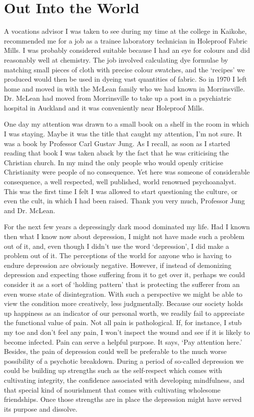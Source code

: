 \chapter{Out Into the World}

A vocations advisor I was taken to see during my time at the college in
Kaikohe, recommended me for a job as a trainee laboratory technician in
Holeproof Fabric Mills. I was probably considered suitable because I had
an eye for colours and did reasonably well at chemistry. The job
involved calculating dye formulae by matching small pieces of cloth with
precise colour swatches, and the `recipes' we produced would then be
used in dyeing vast quantities of fabric. So in 1970 I left home and
moved in with the McLean family who we had known in Morrinsville. Dr.
McLean had moved from Morrinsville to take up a post in a psychiatric
hospital in Auckland and it was conveniently near Holeproof Mills.

One day my attention was drawn to a small book on a shelf in the room in
which I was staying. Maybe it was the title that caught my attention,
I'm not sure. It was a book by Professor Carl Gustav Jung. As I recall,
as soon as I started reading that book I was taken aback by the fact
that he was criticising the Christian church. In my mind the only people
who would openly criticise Christianity were people of no consequence.
Yet here was someone of considerable consequence, a well respected, well
published, world renowned psychoanalyst. This was the first time I felt
I was allowed to start questioning the culture, or even the cult, in
which I had been raised. Thank you very much, Professor Jung and Dr.
McLean.

For the next few years a depressingly dark mood dominated my life. Had I
known then what I know now about depression, I might not have made such
a problem out of it, and, even though I didn't use the word
`depression', I did make a problem out of it. The perceptions of the
world for anyone who is having to endure depression are obviously
negative. However, if instead of demonizing depression and expecting
those suffering from it to get over it, perhaps we could consider it as
a sort of `holding pattern' that is protecting the sufferer from an even
worse state of disintegration. With such a perspective we might be able
to view the condition more creatively, less judgmentally. Because our
society holds up happiness as an indicator of our personal worth, we
readily fail to appreciate the functional value of pain. Not all pain is
pathological. If, for instance, I stub my toe and don't feel any pain, I
won't inspect the wound and see if it is likely to become infected. Pain
can serve a helpful purpose. It says, `Pay attention here.' Besides, the
pain of depression could well be preferable to the much worse
possibility of a psychotic breakdown. During a period of so-called
depression we could be building up strengths such as the self-respect
which comes with cultivating integrity, the confidence associated with
developing mindfulness, and that special kind of nourishment that comes
with cultivating wholesome friendships. Once those strengths are in
place the depression might have served its purpose and dissolve.


